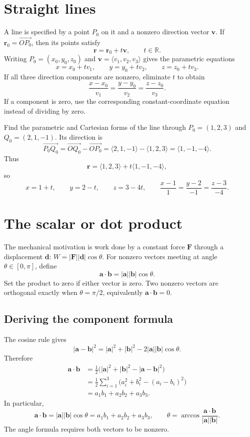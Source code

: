 \section{Straight lines}

A line is specified by a point $P_0$ on it and a nonzero direction vector
$\mathbf v$. If $\mathbf r_0=\overrightarrow{OP_0}$, then its points satisfy
\[
 \boxed{\mathbf r=\mathbf r_0+t\mathbf v,\qquad t\in\mathbb R.}
\]
Writing $P_0=(x_0,y_0,z_0)$ and $\mathbf v=\langle v_1,v_2,v_3\rangle$
gives the parametric equations
\[
 x=x_0+tv_1,\qquad y=y_0+tv_2,\qquad z=z_0+tv_3.
\]
If all three direction components are nonzero, eliminate $t$ to obtain
\[
 \frac{x-x_0}{v_1}=\frac{y-y_0}{v_2}=\frac{z-z_0}{v_3}.
\]
If a component is zero, use the corresponding constant-coordinate equation
instead of dividing by zero.

\begin{example}
Find the parametric and Cartesian forms of the line through
$P_0=(1,2,3)$ and $Q_0=(2,1,-1)$.
Its direction is
\[
 \overrightarrow{P_0Q_0}=\overrightarrow{OQ_0}-\overrightarrow{OP_0}
 =\langle2,1,-1\rangle-\langle1,2,3\rangle=\langle1,-1,-4\rangle.
\]
Thus
\[
 \mathbf r=\langle1,2,3\rangle+t\langle1,-1,-4\rangle,
\]
so
\[
 x=1+t,\qquad y=2-t,\qquad z=3-4t,
 \qquad \frac{x-1}{1}=\frac{y-2}{-1}=\frac{z-3}{-4}.
\]
\end{example}

\section{The scalar or dot product}

The mechanical motivation is work done by a constant force $\mathbf F$
through a displacement $\mathbf d$:
$W=|\mathbf F||\mathbf d|\cos\theta$.
For nonzero vectors meeting at angle $\theta\in[0,\pi]$, define
\[
 \mathbf a\cdot\mathbf b=|\mathbf a||\mathbf b|\cos\theta.
\]
Set the product to zero if either vector is zero. Two nonzero vectors are
orthogonal exactly when $\theta=\pi/2$, equivalently
$\mathbf a\cdot\mathbf b=0$.

\subsection{Deriving the component formula}
The cosine rule gives
\[
 |\mathbf a-\mathbf b|^2=|\mathbf a|^2+|\mathbf b|^2
 -2|\mathbf a||\mathbf b|\cos\theta.
\]
Therefore
\begin{align*}
 \mathbf a\cdot\mathbf b
 &=\frac12\bigl(|\mathbf a|^2+|\mathbf b|^2-|\mathbf a-\mathbf b|^2\bigr)\\
 &=\frac12\sum_{i=1}^3\bigl(a_i^2+b_i^2-(a_i-b_i)^2\bigr)\\
 &=a_1b_1+a_2b_2+a_3b_3.
\end{align*}
In particular,
\[
 \boxed{\mathbf a\cdot\mathbf b
 =|\mathbf a||\mathbf b|\cos\theta
 =a_1b_1+a_2b_2+a_3b_3},
 \qquad
 \theta=\arccos\frac{\mathbf a\cdot\mathbf b}{|\mathbf a||\mathbf b|}.
\]
The angle formula requires both vectors to be nonzero.

